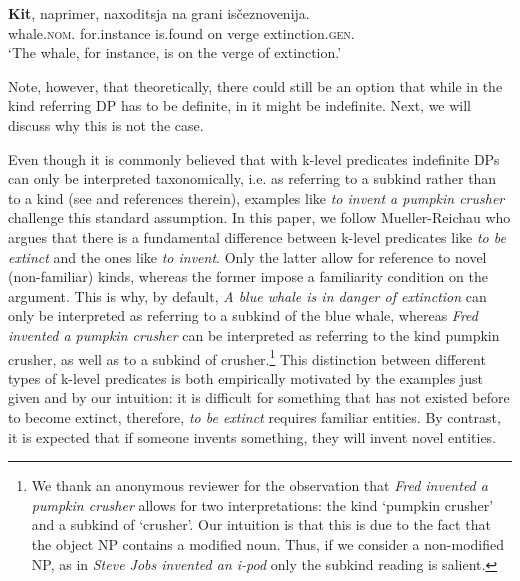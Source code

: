 \documentclass[output=paper
,modfonts
,nonflat]{langsci/langscibook}
\begin{document}
	\ea\label{ex:borik:11}
	\gll	\textbf{Kit}, 				naprimer, 		naxoditsja	 	na 	grani		is\v{c}eznovenija.\\
	whale.\textsc{nom.}	for.instance 	is.found 		on	verge		extinction.\textsc{gen.}\\
	\glt	`The whale, for instance, is on the verge of extinction.'
	\z
	
	Note, however, that theoretically, there could still be an option that while in  the kind referring DP has to be definite, in  it might be indefinite. Next, we will discuss why this is not the case.
	
	Even though it is commonly believed that with k-level predicates indefinite DPs can only be interpreted taxonomically, i.e. as referring to a subkind rather than to a kind (see \citealt{Mueller-Reichau2011} and references therein),  examples like \textit{to invent a pumpkin crusher} challenge this standard assumption. In this paper, we follow Mueller-Reichau who argues that there is a fundamental difference between k-level predicates like \textit{to be extinct} and the ones like \textit{to invent}. Only the latter allow for reference to novel (non-familiar) kinds, whereas the former impose a familiarity condition on the argument. This is why, by default, \textit{A blue whale is in danger of extinction} can only be interpreted as referring to a subkind of the blue whale, whereas \textit{Fred invented a pumpkin crusher} can be interpreted as referring to the kind pumpkin crusher, as well as to a subkind of crusher.\footnote{We thank an anonymous reviewer for the observation that \textit{Fred invented a pumpkin crusher} allows for two interpretations: the kind `pumpkin crusher' and a subkind of `crusher'. Our intuition is that this is due to the fact that the object NP contains a modified noun. Thus, if we consider a non-modified NP, as in \textit{Steve Jobs invented an i-pod} only the subkind reading is salient.} This distinction between different types of k-level predicates is both empirically motivated by the examples just given and by our intuition: it is difficult for something that has not existed before to become extinct, therefore, \textit{to be extinct} requires familiar entities. By contrast, it is expected that if someone invents something, they will invent novel entities. 
	
\end{document}
